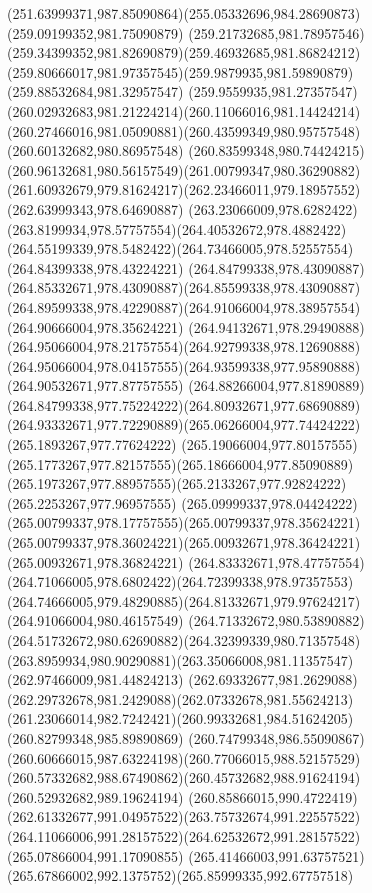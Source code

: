 {{\curveto(251.63999371,987.85090864)(255.05332696,984.28690873)(259.09199352,981.75090879)
\curveto(259.21732685,981.78957546)(259.34399352,981.82690879)(259.46932685,981.86824212)
\curveto(259.80666017,981.97357545)(259.9879935,981.59890879)(259.88532684,981.32957547)
\curveto(259.9559935,981.27357547)(260.02932683,981.21224214)(260.11066016,981.14424214)
\curveto(260.27466016,981.05090881)(260.43599349,980.95757548)(260.60132682,980.86957548)
\curveto(260.83599348,980.74424215)(260.96132681,980.56157549)(261.00799347,980.36290882)
\curveto(261.60932679,979.81624217)(262.23466011,979.18957552)(262.63999343,978.64690887)
\curveto(263.23066009,978.6282422)(263.8199934,978.57757554)(264.40532672,978.4882422)
\curveto(264.55199339,978.5482422)(264.73466005,978.52557554)(264.84399338,978.43224221)
\curveto(264.84799338,978.43090887)(264.85332671,978.43090887)(264.85599338,978.43090887)
\curveto(264.89599338,978.42290887)(264.91066004,978.38957554)(264.90666004,978.35624221)
\curveto(264.94132671,978.29490888)(264.95066004,978.21757554)(264.92799338,978.12690888)
\curveto(264.95066004,978.04157555)(264.93599338,977.95890888)(264.90532671,977.87757555)
\curveto(264.88266004,977.81890889)(264.84799338,977.75224222)(264.80932671,977.68690889)
\curveto(264.93332671,977.72290889)(265.06266004,977.74424222)(265.1893267,977.77624222)
\curveto(265.19066004,977.80157555)(265.1773267,977.82157555)(265.18666004,977.85090889)
\curveto(265.1973267,977.88957555)(265.2133267,977.92824222)(265.2253267,977.96957555)
\curveto(265.09999337,978.04424222)(265.00799337,978.17757555)(265.00799337,978.35624221)
\curveto(265.00799337,978.36024221)(265.00932671,978.36424221)(265.00932671,978.36824221)
\curveto(264.83332671,978.47757554)(264.71066005,978.6802422)(264.72399338,978.97357553)
\curveto(264.74666005,979.48290885)(264.81332671,979.97624217)(264.91066004,980.46157549)
\curveto(264.71332672,980.53890882)(264.51732672,980.62690882)(264.32399339,980.71357548)
\curveto(263.8959934,980.90290881)(263.35066008,981.11357547)(262.97466009,981.44824213)
\curveto(262.69332677,981.2629088)(262.29732678,981.2429088)(262.07332678,981.55624213)
\curveto(261.23066014,982.7242421)(260.99332681,984.51624205)(260.82799348,985.89890869)
\curveto(260.74799348,986.55090867)(260.60666015,987.63224198)(260.77066015,988.52157529)
\curveto(260.57332682,988.67490862)(260.45732682,988.91624194)(260.52932682,989.19624194)
\curveto(260.85866015,990.4722419)(262.61332677,991.04957522)(263.75732674,991.22557522)
\curveto(264.11066006,991.28157522)(264.62532672,991.28157522)(265.07866004,991.17090855)
\curveto(265.41466003,991.63757521)(265.67866002,992.1375752)(265.85999335,992.67757518)
}}
